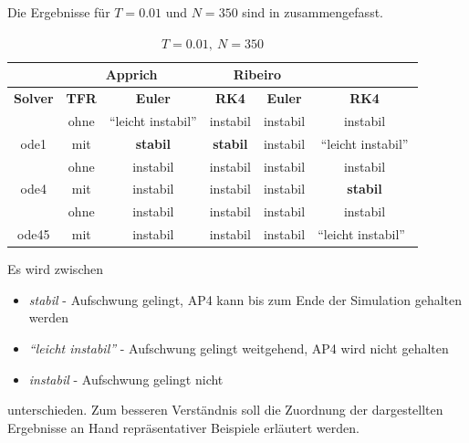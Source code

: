 Die Ergebnisse für $T=0.01$ und $N=350$ sind in  zusammengefasst.
\begin{table}[h]
	\centering
	\caption{$T=0.01, \ N=350$}
		\begin{tabular}{c|c|c|c|c|c}
			\rowcolor[gray]{0.9}
			\multicolumn{2}{c|}{\textbf{Simulation}} & \multicolumn{2}{c|}{\textbf{Apprich}} & \multicolumn{2}{c}{\textbf{Ribeiro}} \\
			\midrule
			\rowcolor[gray]{0.9}
			\textbf{Solver} & \textbf{TFR} & \textbf{Euler} & \textbf{RK4} & \textbf{Euler} & \textbf{RK4} \\
			\midrule
			\cellcolor[gray]{0.9}  											& \cellcolor[gray]{.9}ohne & "`leicht instabil"' & instabil       & instabil & instabil\\
			\multirow{-2}{*}{\cellcolor[gray]{.9}ode1}	& \cellcolor[gray]{.9}mit  & \textbf{stabil} & \textbf{stabil} & instabil & "`leicht instabil"'\\
			\midrule
			\cellcolor[gray]{0.9}  											& \cellcolor[gray]{.9}ohne    & instabil	&  instabil & instabil & instabil\\
			\multirow{-2}{*}{\cellcolor[gray]{.9}ode4}	& \cellcolor[gray]{.9}mit     & instabil  & instabil  & instabil & \textbf{stabil}\\
			\midrule	
			\cellcolor[gray]{0.9}  											& \cellcolor[gray]{.9}ohne    & instabil &  instabil    & instabil 	& instabil\\
			\multirow{-2}{*}{\cellcolor[gray]{.9}ode45}	& \cellcolor[gray]{.9}mit     & instabil &  instabil    & instabil 	& "`leicht instabil"'\																							
		\end{tabular}
	\label{tab:T001N350Fmax400}
\end{table}

Es wird zwischen 

\begin{itemize}
	\item \emph{stabil} - Aufschwung gelingt, AP4 kann bis zum Ende der Simulation gehalten werden
	\item \emph{"`leicht instabil"'} - Aufschwung gelingt weitgehend, AP4 wird nicht gehalten
	\item \emph{instabil} - Aufschwung gelingt nicht
\end{itemize}
unterschieden. Zum besseren Verständnis soll die Zuordnung der dargestellten Ergebnisse an Hand repräsentativer Beispiele erläutert werden.

